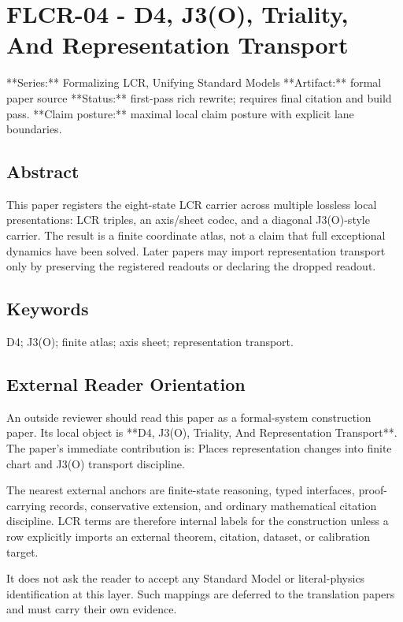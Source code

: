 \documentclass[11pt]{article}
\begin{document}
\section*{FLCR-04 - D4, J3(O), Triality, And Representation Transport}

**Series:** Formalizing LCR, Unifying Standard Models
**Artifact:** formal paper source
**Status:** first-pass rich rewrite; requires final citation and build pass.
**Claim posture:** maximal local claim posture with explicit lane boundaries.

\subsection*{Abstract}

This paper registers the eight-state LCR carrier across multiple lossless local presentations: LCR triples, an axis/sheet codec, and a diagonal J3(O)-style carrier. The result is a finite coordinate atlas, not a claim that full exceptional dynamics have been solved. Later papers may import representation transport only by preserving the registered readouts or declaring the dropped readout.

\subsection*{Keywords}

D4; J3(O); finite atlas; axis sheet; representation transport.

\subsection*{External Reader Orientation}

An outside reviewer should read this paper as a formal-system construction paper. Its local object is **D4, J3(O), Triality, And Representation Transport**. The paper's immediate contribution is: Places representation changes into finite chart and J3(O) transport discipline.

The nearest external anchors are finite-state reasoning, typed interfaces, proof-carrying records, conservative extension, and ordinary mathematical citation discipline. LCR terms are therefore internal labels for the construction unless a row explicitly imports an external theorem, citation, dataset, or calibration target.

It does not ask the reader to accept any Standard Model or literal-physics identification at this layer. Such mappings are deferred to the translation papers and must carry their own evidence.
\end{document}
